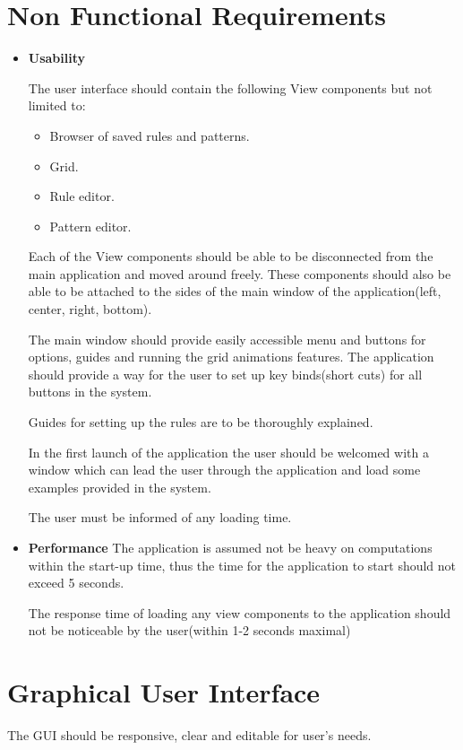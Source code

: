 \documentclass{article}
\begin{document}
\section{Non Functional Requirements}
\begin{itemize}
	
	\item \Large { \bf Usability} 

	The user interface should contain the following View components but not limited to:
	\begin{itemize}
		\item Browser of saved rules and patterns.
		\item Grid.
		\item Rule editor.
		\item Pattern editor.
	\end{itemize}
	Each of the View components should be able to be disconnected from the main application
	and moved around freely. These components should also be able to be attached to the sides
	of the main window of the application(left, center, right, bottom).
	
	The main window should provide easily accessible menu and buttons for options, guides
	and running the grid animations features. The application should provide a way for the user
	to set up key binds(short cuts) for all buttons in the system.
	
	Guides for setting up the rules are to be thoroughly explained.
	
	In the first launch of the application the user should be welcomed with a window
	which can lead the user through the application and load some examples provided in the 
	system.
	
	The user must be informed of any loading time.

	
	\item \Large {\bf Performance }
	The application is assumed not be heavy on computations within the start-up time,
	thus the time for the application to start should not exceed 5 seconds.

	The response time of loading any view components to the application should not be noticeable by the user(within 1-2 seconds maximal)
	
	
\end{itemize} 

\section{Graphical User Interface}
	The GUI should be responsive, clear and editable for user's needs.
	
\end{document}
